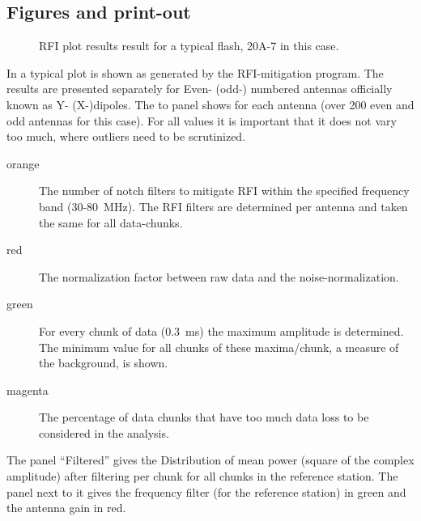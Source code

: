 \subsection{Figures and print-out}


\begin{figure}[th]
	\caption{RFI plot results result for a typical flash, 20A-7 in this case.}	 
\end{figure}

In  a typical plot is shown as generated by the RFI-mitigation program. The results are presented separately for Even- (odd-) numbered antennas officially known as Y- (X-)dipoles. The to panel shows for each antenna (over 200 even and odd antennas for this case). For all values it is important that it does not vary too much, where outliers need to be scrutinized.
\begin{description}
\item[orange] The number of notch filters to mitigate RFI within the specified frequency band (30-80~MHz). The RFI filters are determined per antenna and taken the same for all data-chunks.
\item[red] The normalization factor between raw data and the noise-normalization.
\item[green] For every chunk of data (0.3~ms) the maximum amplitude is determined. The minimum value for all chunks of these maxima/chunk, a measure of the background, is shown.
\item[magenta] The percentage of data chunks that have too much data loss to be considered in the analysis.
\end{description}
The panel ``Filtered'' gives the Distribution of mean power (square of the complex amplitude) after filtering per chunk for all chunks in the reference station.
The panel next to it gives the frequency filter (for the reference station) in green and the antenna gain in red.


